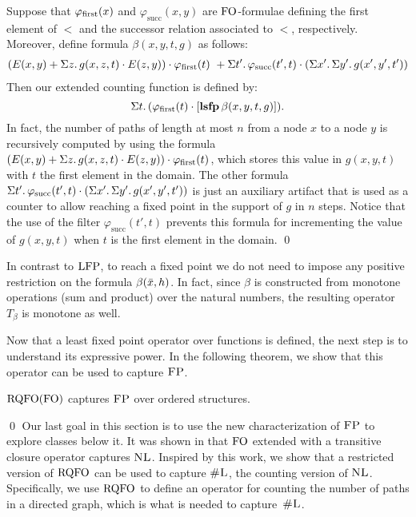 \begin{exa}
Suppose that $\varphi_{\text{\rm first}}(x)$ and $\varphi_{\text{succ}}(x,y)$ are ${\rm FO}$-formulae defining the first element of $<$ and the successor relation associated to $<$, respectively.
Moreover, define formula $\beta(x, y, t, g)$ as follows:
\begin{align*}
(E(x,y) + \Sigma{z}.\, g(x,z,t)\cdot E(z,y)) \cdot \varphi_{\text{\rm first}}(t) \ +
\Sigma{t'}.\, \varphi_{\text{succ}}(t',t) \cdot \left(\Sigma{x'}.\, \Sigma{y'}.\, g(x',y',t') \right)
\end{align*}
Then our extended counting function is defined by:
$$
\Sigma{t}.\, (\varphi_{\text{\rm first}}(t) \cdot [{\bf lsfp} \, \beta(x,y,t,g)]).
$$ 
In fact, the number of paths of length at most $n$ from a node $x$ to a node $y$ is recursively computed by using the formula $(E(x,y) + \Sigma{z}.\, g(x,z,t)\cdot E(z,y)) \cdot \varphi_{\text{\rm first}}(t)$, which stores this value in $g(x,y,t)$ with $t$ the first element in the domain.  The other formula $\Sigma{t'}.\, \varphi_{\text{succ}}(t',t) \cdot \left(\Sigma{x'}.\, \Sigma{y'}.\, g(x',y',t') \right)$ is just an auxiliary artifact that is used as a counter to allow reaching a fixed point in the support of $g$ in $n$ steps. Notice that the use of the filter $\varphi_{\text{succ}}(t',t)$ prevents this formula for incrementing the value of $g(x,y,t)$ when $t$ is the first element in the domain.
\qed
\end{exa}

In contrast to ${\rm LFP}$, to reach a fixed point we do not need to impose any positive restriction on the formula $\beta(\bar{x},h)$.
In fact, since $\beta$ is constructed from monotone operations (sum and product) over the natural numbers, the resulting operator $T_{\beta}$ is monotone as well.

Now that a least fixed point operator over functions is defined, the next step is to understand its expressive power.
In the following theorem, we show that this operator can be used to capture $\text{\sc FP}$.
\begin{thm} \label{rqfo-fo-cap}
	${\rm RQFO}({\rm FO})$ captures $\text{\sc FP}$ over ordered structures.
\end{thm}
\proof

\qed
Our last goal in this section is to use the new characterization of $\text{\sc FP}$ to explore classes below it.
It was shown in \cite{I86,I88} that ${\rm FO}$ extended with a transitive closure operator captures $\text{\sc NL}$. 
Inspired by this work, we show that a restricted version of ${\rm RQFO}$ can be used to capture $\text{\sc \#L}$, the counting version of $\text{\sc NL}$. 
Specifically, we use ${\rm RQFO}$ to define an operator for counting the number of paths in a directed graph, which is what is needed to capture~$\text{\sc \#L}$.

